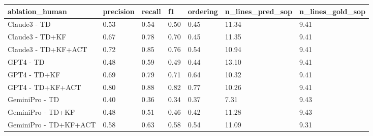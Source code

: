 \begin{tabular}{lllllll}
\toprule
ablation_human & precision & recall & f1 & ordering & n_lines_pred_sop & n_lines_gold_sop \\
\midrule
Claude3 - TD & 0.53 & 0.54 & 0.50 & 0.45 & 11.34 & 9.41 \\
Claude3 - TD+KF & 0.67 & 0.78 & 0.70 & 0.45 & 11.35 & 9.41 \\
Claude3 - TD+KF+ACT & 0.72 & 0.85 & 0.76 & 0.54 & 10.94 & 9.41 \\
GPT4 - TD & 0.48 & 0.59 & 0.49 & 0.44 & 13.10 & 9.41 \\
GPT4 - TD+KF & 0.69 & 0.79 & 0.71 & 0.64 & 10.32 & 9.41 \\
GPT4 - TD+KF+ACT & 0.80 & 0.88 & 0.82 & 0.77 & 10.26 & 9.41 \\
GeminiPro - TD & 0.40 & 0.36 & 0.34 & 0.37 & 7.31 & 9.43 \\
GeminiPro - TD+KF & 0.48 & 0.51 & 0.46 & 0.42 & 11.28 & 9.43 \\
GeminiPro - TD+KF+ACT & 0.58 & 0.63 & 0.58 & 0.54 & 11.09 & 9.31 \\
\bottomrule
\end{tabular}
